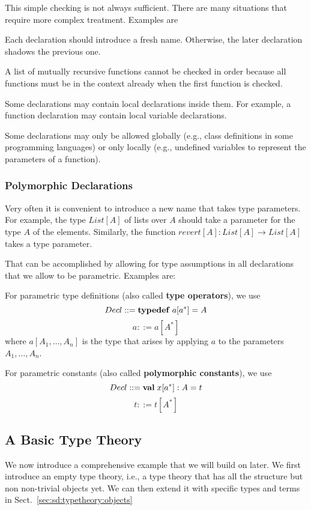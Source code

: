 This simple checking is not always sufficient.
There are many situations that require more complex treatment.
Examples are
\begin{compactitem}
 \item Each declaration should introduce a fresh name. Otherwise, the later declaration shadows the previous one.
 \item A list of mutually recursive functions cannot be checked in order because all functions must be in the context already when the first function is checked.
 \item Some declarations may contain local declarations inside them. For example, a function declaration may contain local variable declarations.
 \item Some declarations may only be allowed globally (e.g., class definitions in some programming languages) or only locally (e.g., undefined variables to represent the parameters of a function).
\end{compactitem}

\subsubsection{Polymorphic Declarations}

Very often it is convenient to introduce a new name that takes type parameters.
For example, the type $List[A]$ of lists over $A$ should take a parameter for the type $A$ of the elements.
Similarly, the function $revert[A]:List[A]\to List[A]$ takes a type parameter.

That can be accomplished by allowing for type assumptions in all declarations that we allow to be parametric.
Examples are:
\begin{compactitem}
 \item For parametric type definitions (also called \textbf{type operators}), we use
  \[Decl ::= {\rm \bf typedef}\; a[a^*] = A\]
  \[a ::= a[A^*]\]
  where $a[A_1,\ldots,A_n]$ is the type that arises by applying $a$ to the parameters $A_1,\ldots,A_n$.
 \item For parametric constants (also called \textbf{polymorphic constants}), we use
  \[Decl ::= \aval{x[a^*]}{A}{t}\]
  \[t ::= t[A^*]\]
\end{compactitem}


\subsection{A Basic Type Theory}

We now introduce a comprehensive example that we will build on later.
We first introduce an empty type theory, i.e., a type theory that has all the structure but non non-trivial objects yet.
We can then extend it with specific types and terms in Sect.~\ref{sec:sd:typetheory:objects}

